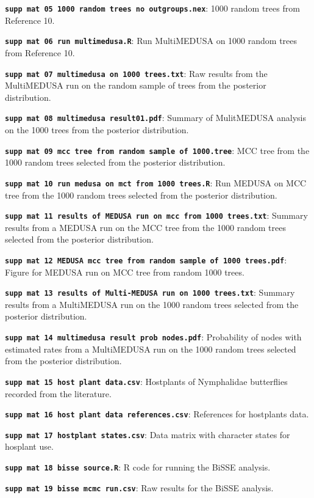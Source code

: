 \documentclass[10pt]{article}
\begin{document}
\textbf{\texttt{supp mat 05 1000 random trees no outgroups.nex}}:
1000 random trees from Reference 10.

\textbf{\texttt{supp mat 06 run multimedusa.R}}: Run MultiMEDUSA on
1000 random trees from Reference 10.

\textbf{\texttt{supp mat 07 multimedusa on 1000 trees.txt}}: Raw
results from the MultiMEDUSA run on the random sample of trees from the
posterior distribution.

\textbf{\texttt{supp mat 08 multimedusa result01.pdf}}: Summary of
MulitMEDUSA analysis on the 1000 trees from the posterior distribution.

\textbf{\texttt{supp mat 09 mcc tree from random sample of 1000.tree}}:
MCC tree from the 1000 random trees selected from the posterior
distribution.

\textbf{\texttt{supp mat 10 run medusa on mct from 1000 trees.R}}:
Run MEDUSA on MCC tree from the 1000 random trees selected from the
posterior distribution.

\textbf{\texttt{supp mat 11 results of MEDUSA run on mcc from 1000 trees.txt}}:
Summary results from a MEDUSA run on the MCC tree from the 1000 random
trees selected from the posterior distribution.

\textbf{\texttt{supp mat 12 MEDUSA mcc tree from random sample of 1000 trees.pdf}}:
Figure for MEDUSA run on MCC tree from random 1000 trees.

\textbf{\texttt{supp mat 13 results of Multi-MEDUSA run on 1000 trees.txt}}:
Summary results from a MultiMEDUSA run on the 1000 random trees selected
from the posterior distribution.

\textbf{\texttt{supp mat 14 multimedusa result prob nodes.pdf}}:
Probability of nodes with estimated rates from a MultiMEDUSA run on the
1000 random trees selected from the posterior distribution.

\textbf{\texttt{supp mat 15 host plant data.csv}}: Hostplants of
Nymphalidae butterflies recorded from the literature.

\textbf{\texttt{supp mat 16 host plant data references.csv}}:
References for hostplants data.

\textbf{\texttt{supp mat 17 hostplant states.csv}}: Data matrix with
character states for hosplant use.

\textbf{\texttt{supp mat 18 bisse source.R}}: R code for running the
BiSSE analysis.

\textbf{\texttt{supp mat 19 bisse mcmc run.csv}}: Raw results for
the BiSSE analysis.
\end{document}
